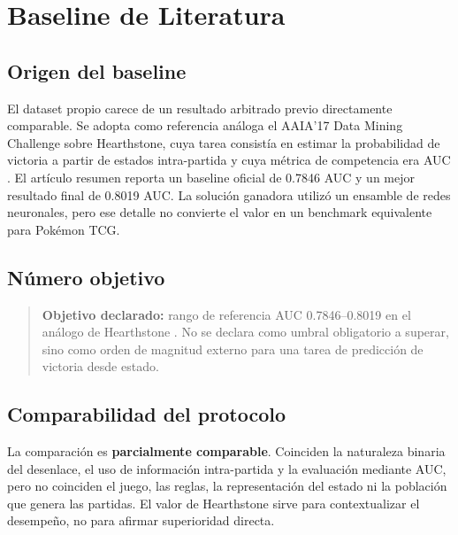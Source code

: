 \section{Baseline de Literatura}
\label{sec:baseline}

\subsection{Origen del baseline}
\label{subsec:origenbaseline}
El dataset propio carece de un resultado arbitrado previo directamente
comparable. Se adopta como referencia análoga el AAIA'17 Data Mining
Challenge sobre Hearthstone, cuya tarea consistía en estimar la
probabilidad de victoria a partir de estados intra-partida y cuya
métrica de competencia era AUC \cite{janusz_hearthstone_2017}. El
artículo resumen reporta un baseline oficial de 0.7846 AUC y un mejor
resultado final de 0.8019 AUC. La solución ganadora utilizó un ensamble
de redes neuronales, pero ese detalle no convierte el valor en un
benchmark equivalente para Pokémon TCG.

\subsection{Número objetivo}
\label{subsec:objetivobaseline}
\begin{quote}
\textbf{Objetivo declarado:} rango de referencia AUC 0.7846--0.8019 en
el análogo de Hearthstone \cite{janusz_hearthstone_2017}. No se declara
como umbral obligatorio a superar, sino como orden de magnitud externo
para una tarea de predicción de victoria desde estado.
\end{quote}

\subsection{Comparabilidad del protocolo}
\label{subsec:comparabilidad}
La comparación es \textbf{parcialmente comparable}. Coinciden la
naturaleza binaria del desenlace, el uso de información intra-partida y
la evaluación mediante AUC, pero no coinciden el juego, las reglas, la
representación del estado ni la población que genera las partidas. El
valor de Hearthstone sirve para contextualizar el desempeño, no para
afirmar superioridad directa.

